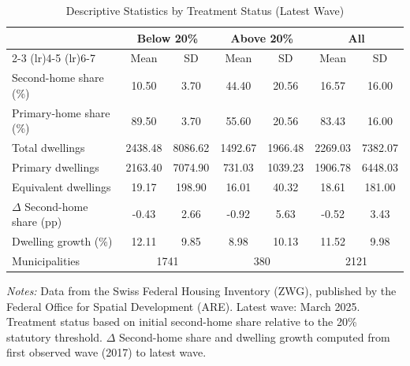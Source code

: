 \begin{table}[htbp]
\centering
\begin{threeparttable}
\caption{Descriptive Statistics by Treatment Status (Latest Wave)}
\label{tab:descriptive}
\begin{tabular}{lcccccc}
\toprule
 & \multicolumn{2}{c}{Below 20\%} & \multicolumn{2}{c}{Above 20\%} & \multicolumn{2}{c}{All} \\
\cmidrule(lr){2-3} \cmidrule(lr){4-5} \cmidrule(lr){6-7}
 & Mean & SD & Mean & SD & Mean & SD \\
\midrule
Second-home share (\%) & 10.50 & 3.70 & 44.40 & 20.56 & 16.57 & 16.00 \\
Primary-home share (\%) & 89.50 & 3.70 & 55.60 & 20.56 & 83.43 & 16.00 \\
Total dwellings & 2438.48 & 8086.62 & 1492.67 & 1966.48 & 2269.03 & 7382.07 \\
Primary dwellings & 2163.40 & 7074.90 & 731.03 & 1039.23 & 1906.78 & 6448.03 \\
Equivalent dwellings & 19.17 & 198.90 & 16.01 & 40.32 & 18.61 & 181.00 \\
$\Delta$ Second-home share (pp) & -0.43 & 2.66 & -0.92 & 5.63 & -0.52 & 3.43 \\
Dwelling growth (\%) & 12.11 & 9.85 & 8.98 & 10.13 & 11.52 & 9.98 \\
\midrule
Municipalities & \multicolumn{2}{c}{1741} & \multicolumn{2}{c}{380} & \multicolumn{2}{c}{2121} \\
\bottomrule
\end{tabular}
\begin{tablenotes}[flushleft]
\small
\item \textit{Notes:} Data from the Swiss Federal Housing Inventory (ZWG), published by the Federal Office for Spatial Development (ARE). Latest wave: March 2025. Treatment status based on initial second-home share relative to the 20\% statutory threshold. $\Delta$ Second-home share and dwelling growth computed from first observed wave (2017) to latest wave.
\end{tablenotes}
\end{threeparttable}
\end{table}
